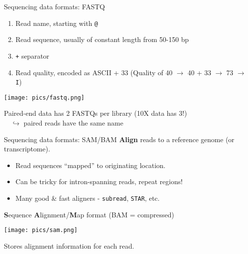 \documentclass{beamer}
\begin{document}
\begin{frame}{Sequencing data formats: FASTQ}
\begin{enumerate}
\item Read name, starting with \texttt{@}
\item Read sequence, usually of constant length from 50-150 bp
\item \texttt{+} separator
\item Read quality, encoded as ASCII + 33 {\tiny (Quality of 40 $\to$ 40 + 33 $\to$ 73 $\to$ \texttt{I})}
\end{enumerate}
\begin{center}
\texttt{[image: pics/fastq.png]}
\end{center}
Paired-end data has 2 FASTQs per library (10X data has 3!)\\
$\quad\hookrightarrow$ paired reads have the same name      
\end{frame}

\begin{frame}{Sequencing data formats: SAM/BAM}
\textbf{Align} reads to a reference genome (or transcriptome).
\begin{itemize}
\item Read sequences ``mapped'' to originating location.
\item Can be tricky for intron-spanning reads, repeat regions!
\item Many good \& fast aligners - \texttt{subread}, \texttt{STAR}, etc.
\end{itemize}
\vspace{0.1in}
\textbf{S}equence \textbf{A}lignment/\textbf{M}ap format (BAM = compressed)
\begin{center}
\texttt{[image: pics/sam.png]}
\end{center}
Stores alignment information for each read.
\end{frame}
\end{document}
